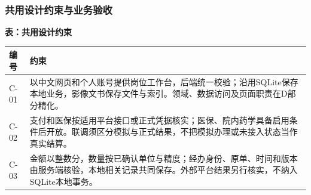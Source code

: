 \documentclass[UTF8,a4paper,zihao=-4,fontset=none]{ctexart}
\begin{document}
\subsubsection{共用设计约束与业务验收}
{\setlength{\tabcolsep}{3pt}\renewcommand{\arraystretch}{1.08}
\noindent\textbf{表\thetable：共用设计约束}\par\smallskip
\noindent\begin{tabular}{@{}>{\raggedright\arraybackslash}p{1.45cm}>{\raggedright\arraybackslash}p{14.25cm}@{}}
\toprule
编号 & 约束 \\ \midrule
C-01 & 以中文网页和个人账号提供岗位工作台，后端统一校验；沿用SQLite保存本地业务，影像文书保存文件与索引。领域、数据访问及页面职责在D部分精化。 \\
C-02 & 支付和医保按适用平台接口或正式凭据核实；医保、院内药学具备启用条件后开放。联调须区分模拟与正式结果，不把模拟办理或未接入状态当作真实结算。 \\
C-03 & 金额以整数分，数量按已确认单位与精度；经办身份、原单、时间和版本由服务端核验，本地相关记录共同保存。外部平台结果另行核实，不纳入SQLite本地事务。 \\
\bottomrule
\end{tabular}\par}
\medskip
\end{document}
